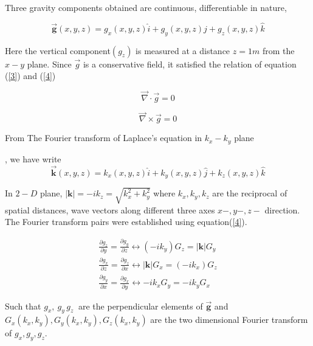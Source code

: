 \documentclass[a4paper,11pt]{article}
\begin{document}
\noindent Three gravity components obtained are continuous, differentiable in nature,

\begin{equation} \label{2}
    \Vec{\textbf{g}}(x,y,z)= g_{x}(x,y,z)\hat{i} + g_{y}(x,y,z)\hat{j} + g_{z}(x,y,z)\hat{k}
\end{equation}

Here the vertical component$(g_{z})$ is measured at a distance $z=1m$ from the $x-y$ plane. Since $\Vec{g}$ is a conservative field, it satisfied the relation of equation (\ref{3}) and (\ref{4})

\begin{equation} \label{3}
     \vec{\nabla}\cdot \vec{g} =0
\end{equation}

\begin{equation}\label{4}
\vec{\nabla}\times \vec{g} = 0
\end{equation}

From The Fourier transform of Laplace's equation in $k_{x}-k_{y}$ plane 

\cite{blakely1996potential}, we have write \begin{equation}\label{5}
    \Vec{\textbf{k}}(x,y,z)= k_x(x,y,z)\hat{i} + k_y(x,y,z)\hat{j} + k_z(x,y,z)\hat{k}
\end{equation}

\noindent In $2-D$ plane, ${|\textbf{k}|}=-ik_{z} =\sqrt{k_x^2+k_y^2}$ \medskip
where $k_x, k_y,k_z $ are the reciprocal of spatial distances, wave vectors along different three axes $x-,y-,z-$ direction. The Fourier transform pairs were established using equation(\ref{4}).

\begin{subequations} \label{eq:6} 
\begin{align} 
\frac{\partial g_{z}}{\partial y}=\frac{\partial g_{y}}{\partial z} \leftrightarrow (-ik_{y})G_{z} = |\textbf{k}| G_{y} \label{sub-eq-1:6}\\
\frac{\partial g_{x}}{\partial z}=\frac{\partial g_{z}}{\partial x} \leftrightarrow |\textbf{k}|G_{x}  =(-ik_{x}) G_{z} \label{sub-eq-2:6}\\
\frac{\partial g_{y}}{\partial x}=\frac{\partial g_x}{\partial y}\leftrightarrow  -ik_{x}G_{y} =-ik_{y}G_{x} \label{sub-eq-3:6} 
\end{align}
\end{subequations}

\noindent Such that $ g_{x},\ g_{y}\, g_{z}\ $ are the perpendicular elements of $\Vec{\textbf{g}}$ and $G_{x}(k_x,k_y), G_{y}(k_{x},k_{y}), G_{z}(k_x,k_y)$ are the two dimensional Fourier transform of $g_{x}, g_{y}, g_{z}$. \medskip
\end{document}

